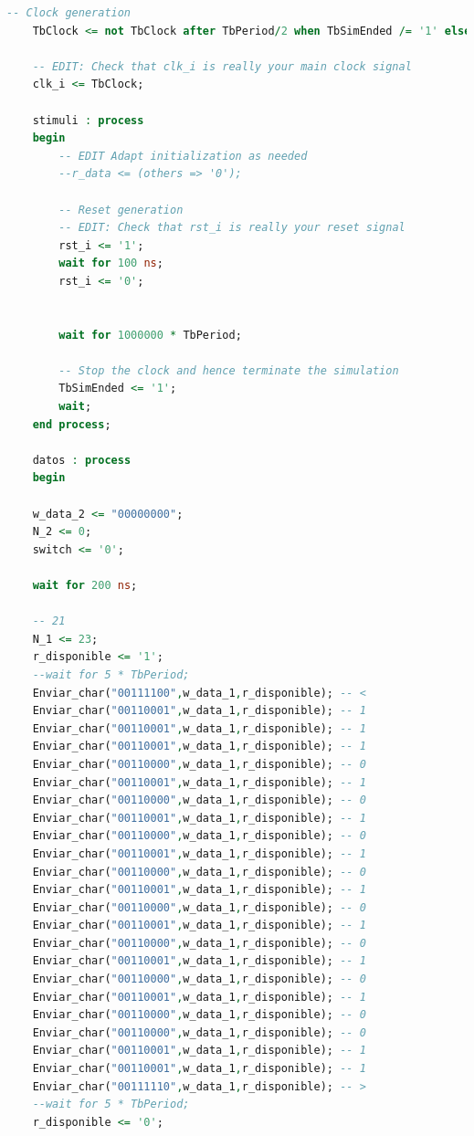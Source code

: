 \begin{lstlisting}[language = vhdl,caption=Testbench del módulo selector,label={lst:test_selector}]
    -- Clock generation
    TbClock <= not TbClock after TbPeriod/2 when TbSimEnded /= '1' else '0';

    -- EDIT: Check that clk_i is really your main clock signal
    clk_i <= TbClock;

    stimuli : process
    begin
        -- EDIT Adapt initialization as needed
        --r_data <= (others => '0');

        -- Reset generation
        -- EDIT: Check that rst_i is really your reset signal
        rst_i <= '1';
        wait for 100 ns;
        rst_i <= '0';

	
        wait for 1000000 * TbPeriod;

        -- Stop the clock and hence terminate the simulation
        TbSimEnded <= '1';
        wait;
    end process;

    datos : process
    begin
        
	w_data_2 <= "00000000";
	N_2 <= 0;
	switch <= '0';

	wait for 200 ns;

	-- 21
	N_1 <= 23; 	
	r_disponible <= '1';
	--wait for 5 * TbPeriod;
	Enviar_char("00111100",w_data_1,r_disponible); -- < 	
	Enviar_char("00110001",w_data_1,r_disponible); -- 1 	
	Enviar_char("00110001",w_data_1,r_disponible); -- 1
 	Enviar_char("00110001",w_data_1,r_disponible); -- 1 	
	Enviar_char("00110000",w_data_1,r_disponible); -- 0
	Enviar_char("00110001",w_data_1,r_disponible); -- 1 	
	Enviar_char("00110000",w_data_1,r_disponible); -- 0
	Enviar_char("00110001",w_data_1,r_disponible); -- 1 	
	Enviar_char("00110000",w_data_1,r_disponible); -- 0
	Enviar_char("00110001",w_data_1,r_disponible); -- 1 	
	Enviar_char("00110000",w_data_1,r_disponible); -- 0
	Enviar_char("00110001",w_data_1,r_disponible); -- 1 	
	Enviar_char("00110000",w_data_1,r_disponible); -- 0
	Enviar_char("00110001",w_data_1,r_disponible); -- 1 	
	Enviar_char("00110000",w_data_1,r_disponible); -- 0
	Enviar_char("00110001",w_data_1,r_disponible); -- 1 	
	Enviar_char("00110000",w_data_1,r_disponible); -- 0
	Enviar_char("00110001",w_data_1,r_disponible); -- 1 	
	Enviar_char("00110000",w_data_1,r_disponible); -- 0
	Enviar_char("00110000",w_data_1,r_disponible); -- 0	
	Enviar_char("00110001",w_data_1,r_disponible); -- 1 
	Enviar_char("00110001",w_data_1,r_disponible); -- 1 	
	Enviar_char("00111110",w_data_1,r_disponible); -- >
	--wait for 5 * TbPeriod;
	r_disponible <= '0';
	

\end{lstlisting}
